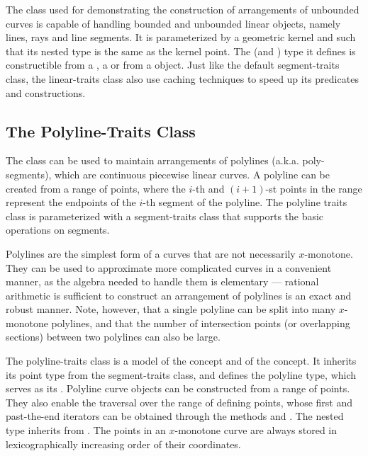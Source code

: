 
The  class used for demonstrating the
construction of arrangements of unbounded curves is capable of handling
bounded and unbounded linear objects, namely lines, rays and line
segments. It is parameterized by a geometric kernel and such that
its nested  type is the same as the kernel point. The
 (and ) type it defines is
constructible from a , a  or
from a  object. Just like the default
segment-traits class, the linear-traits class also use caching
techniques to speed up its predicates and constructions.

\subsection{The Polyline-Traits Class\label{arr_ssec:tr_polylines}}

The  class can be used
to maintain arrangements of polylines (a.k.a. poly-segments),
which are continuous piecewise linear curves. A polyline can be
created from a range of points, where the $i$-th and $(i+1)$-st
points in the range represent the endpoints of the $i$-th segment
of the polyline. The polyline traits class is parameterized with a
segment-traits class that supports the basic operations on
segments.

Polylines are the simplest form of a curves that are not
necessarily $x$-monotone. They can be used to approximate more
complicated curves in a convenient manner, as the algebra needed
to handle them is elementary --- rational arithmetic is sufficient
to construct an arrangement of polylines is an exact and robust
manner. Note, however, that a single polyline can be split into
many $x$-monotone polylines, and that the number of intersection
points (or overlapping sections) between two polylines can also
be large. 

The polyline-traits class is a model of the 
concept and of the  concept.
It inherits its point type from the segment-traits class, and defines
the polyline type, which serves as its . Polyline curve
objects can be constructed from a range of points. They also enable
the traversal over the range of defining points, whose first and
past-the-end iterators can be obtained through the methods 
and . The nested  type inherits
from . The points in an $x$-monotone curve are
always stored in lexicographically increasing order of their
coordinates.

